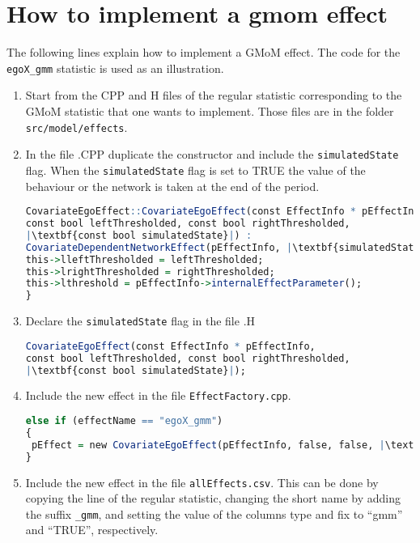 \documentclass[a4paper,11pt]{article}
\begin{document}
\newpage
\section*{How to implement a gmom effect}
The following lines explain how to implement a GMoM effect. The code for the \texttt{egoX\_gmm} statistic is used as an illustration.
\begin{enumerate}
	\item Start from the CPP and H files of the regular statistic corresponding to the GMoM statistic that one wants to implement. Those files are in the folder \texttt{src/model/effects}.
	\item In the file .CPP duplicate the constructor and include the \texttt{simulatedState} flag. When the \texttt{simulatedState} flag is set to TRUE the value of the behaviour or the network is taken at the end of the period.
	
\begin{lstlisting}[language=R]
CovariateEgoEffect::CovariateEgoEffect(const EffectInfo * pEffectInfo,
const bool leftThresholded, const bool rightThresholded,
|\textbf{const bool simulatedState}|) :
CovariateDependentNetworkEffect(pEffectInfo, |\textbf{simulatedState}|) {
this->lleftThresholded = leftThresholded;
this->lrightThresholded = rightThresholded;
this->lthreshold = pEffectInfo->internalEffectParameter();
}
\end{lstlisting}

\item Declare the \texttt{simulatedState} flag in the file .H
\begin{lstlisting}[language=R]
CovariateEgoEffect(const EffectInfo * pEffectInfo,
const bool leftThresholded, const bool rightThresholded,
|\textbf{const bool simulatedState}|);
\end{lstlisting}
\item Include the new effect in the file \texttt{EffectFactory.cpp}.
\begin{lstlisting}[language=R]
else if (effectName == "egoX_gmm")
{
 pEffect = new CovariateEgoEffect(pEffectInfo, false, false, |\textbf{true}|);
}
\end{lstlisting}
\item Include the new effect in the file \texttt{allEffects.csv}. This can be done by copying the line of the regular statistic, changing the short name by adding the suffix \texttt{\_gmm}, and setting the value of the columns type and fix to ``gmm'' and ``TRUE'', respectively.
\end{enumerate}
\end{document}
